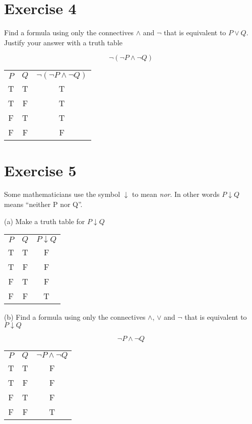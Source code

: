 \documentclass[11pt]{article}
\begin{document}
\section*{Exercise 4}

Find a formula using only the connectives $\wedge$ and $\neg$ that is equivalent to $P \vee Q$. Justify your answer with a truth table

$$\neg (\neg P \wedge \neg Q)$$

\begin{center}
\begin{tabular}{ c c c  }
 $P$ & $Q$ & $\neg (\neg P \wedge \neg Q)$\\ 
T & T & T\\  
T & F & T\\
F & T & T\\  
F & F & F
\end{tabular}
\end{center}

\section*{Exercise 5}

Some mathematicians use the symbol $\downarrow$ to mean \textit{nor}. In other words $P \downarrow Q$ means ``neither P nor Q''.

\noindent (a) Make a truth table for $P \downarrow Q$

\begin{center}
\begin{tabular}{ c c c }
 $P$ & $Q$ & $P \downarrow Q$\\ 
T & T & F\\  
T & F & F\\
F & T & F\\  
F & F & T
\end{tabular}
\end{center}

\noindent (b) Find a formula using only the connectives $\wedge$, $\vee$ and $\neg$ that is equivalent to $P \downarrow Q$

$$\neg P \wedge \neg Q$$

\begin{center}
\begin{tabular}{ c c c }
 $P$ & $Q$ & $\neg P \wedge \neg Q$\\ 
T & T & F\\  
T & F & F\\
F & T & F\\  
F & F & T
\end{tabular}
\end{center}
\end{document}
